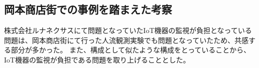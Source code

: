 \subsection{岡本商店街での事例を踏まえた考察}
株式会社ルナネクサスにて問題となっていたIoT機器の監視が負担となっている問題は、岡本商店街にて行った人流観測実験でも問題となっていたため、共感する部分が多かった。
また、構成として似たような構成をとっていることから、IoT機器の監視が負担である問題を取り上げることとした。


